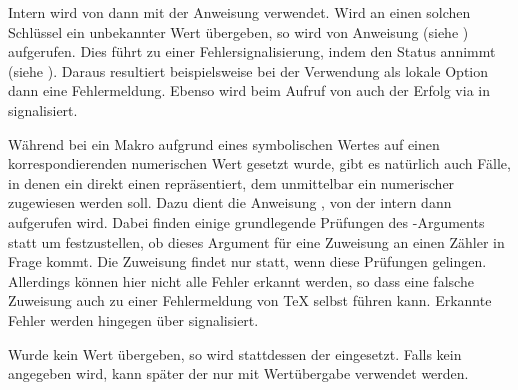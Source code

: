 Intern wird von  dann
 mit der Anweisung
 verwendet. Wird an einen solchen Schlüssel ein
unbekannter Wert übergeben, so wird von  Anweisung
 (siehe
) aufgerufen. Dies führt zu
einer Fehlersignalisierung, indem  den
Status  annimmt (siehe
). Daraus resultiert
beispielsweise bei der Verwendung als lokale Option dann eine
Fehlermeldung. Ebenso wird beim Aufruf von  auch der
Erfolg via  in
 signalisiert.%
%
\EndIndexGroup


\begin{Declaration}
\end{Declaration}
Während bei
 ein Makro aufgrund eines
symbolischen Wertes auf einen korrespondierenden numerischen Wert
gesetzt wurde, gibt es natürlich auch Fälle, in denen ein 
direkt einen  repräsentiert, dem unmittelbar ein
numerischer  zugewiesen werden soll. Dazu dient die Anweisung
, von der intern dann 
aufgerufen wird. Dabei finden einige grundlegende Prüfungen des
-Arguments statt um festzustellen, ob dieses Argument für eine
Zuweisung an einen Zähler in Frage kommt. Die Zuweisung findet nur statt, wenn
diese Prüfungen gelingen. Allerdings können hier nicht alle Fehler erkannt
werden, so dass eine falsche Zuweisung auch zu einer Fehlermeldung von \TeX{}
selbst führen kann. Erkannte Fehler werden hingegen über
 signalisiert.

Wurde kein Wert übergeben, so wird
stattdessen der  eingesetzt. Falls kein 
angegeben wird, kann später der  nur mit Wertübergabe
verwendet werden.%
\iffalse%
\ Anderenfalls wir mit
\DescRef{\LabelBase.cmd.FamilyKeyStateNeedValue} ein entsprechender Fehler
signalisiert und beispielsweise innerhalb \Macro{FamilyOptions}  auch als
solcher gemeldet.%
\fi%
\EndIndexGroup



